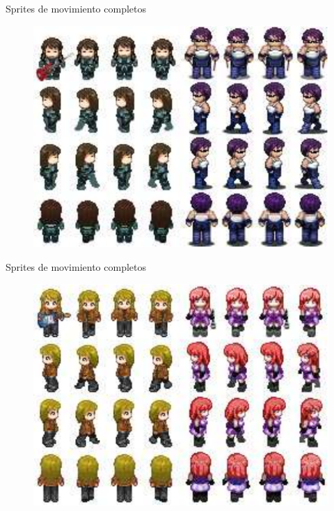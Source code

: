 \documentclass[9pt,xcolor=svgnames]{beamer}
\begin{document}
  \begin{frame}{Sprites de movimiento completos}
   \transdissolve
   
   \begin{figure}[t]
    \centering
    \includegraphics[scale=0.9]{./Imagenes/bajo_bateria.pdf}    
   \end{figure}
  \end{frame}
  
  
  \begin{frame}{Sprites de movimiento completos}
   \transdissolve
   
   \begin{figure}[t]
    \centering
    \includegraphics[scale=0.9]{./Imagenes/guitarra_cantante.pdf}    
   \end{figure}
  \end{frame}
  
\end{document}

